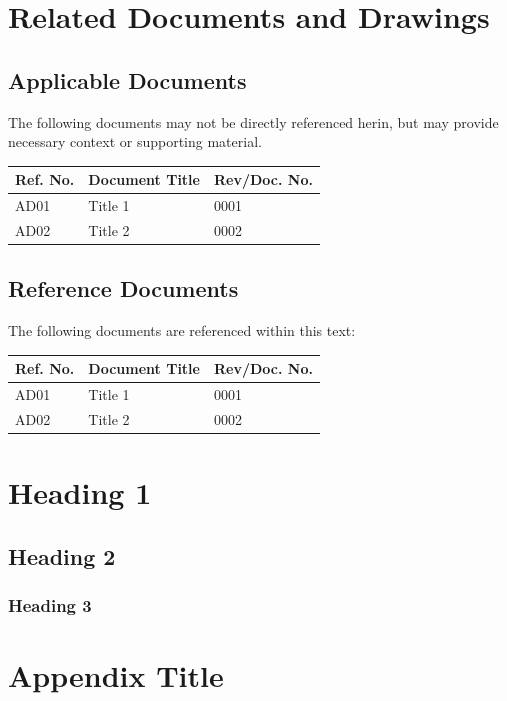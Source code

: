 \documentclass[titlepage]{article}
\begin{document}
\section{Related Documents and Drawings}
\subsection{Applicable Documents}
The following documents may not be directly referenced herin, but may provide necessary context or supporting material.
\begin{center}
\begin{tabular}{|m{2cm}|m{7cm}|m{2.5cm}|} \hline
    Ref. No. & Document Title & Rev/Doc. No. \\ \hline
    AD01 & Title 1 & 0001 \\
    AD02 & Title 2 & 0002 \\
    \hline
\end{tabular}
\end{center}

\subsection{Reference Documents}
The following documents are referenced within this text:
\begin{center}
\begin{tabular}{|m{2cm}|m{7cm}|m{2.5cm}|} \hline
    Ref. No. & Document Title & Rev/Doc. No. \\ \hline
    AD01 & Title 1 & 0001 \\
    AD02 & Title 2 & 0002 \\
    \hline
\end{tabular}
\end{center}

\section{Heading 1}


\subsection{Heading 2}


\subsubsection{Heading 3}


\appendix
\section{Appendix Title}



\end{document}
